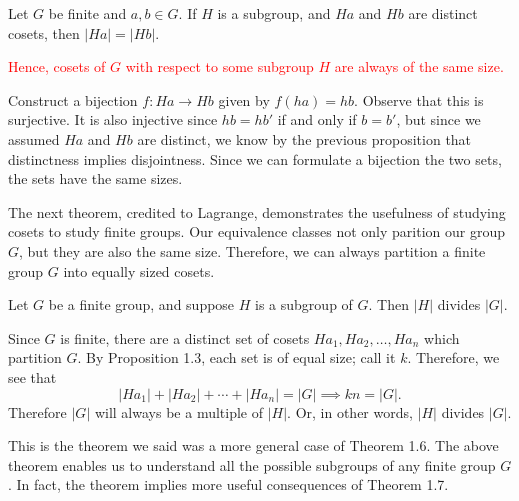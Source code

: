     \begin{proposition}
        Let $G$ be finite and $a, b \in G$. If $H$ is a subgroup, and 
        $Ha$ and $Hb$ are distinct cosets, then $|Ha| = |Hb|$.
    \end{proposition}
        \textcolor{red}{Hence, cosets of $G$ with respect to some
        subgroup $H$ are always of the same size.}
    \begin{prf}
        Construct a bijection $f: Ha \to Hb$ given by $f(ha) = hb$.
        Observe that this is surjective. It is also injective since
        $hb = hb'$ 
        if and only if $b = b'$, but since we assumed $Ha$ and $Hb$
        are distinct, we know by the previous proposition that
        distinctness implies disjointness. Since we can formulate a bijection
        the two sets, the sets have the same sizes.
    \end{prf}

    The next theorem, credited to Lagrange, demonstrates the
    usefulness of studying cosets to study finite groups. Our
    equivalence classes not only parition our group $G$, but they are
    also the same size. Therefore, we can always partition a finite group
    $G$ into equally sized cosets. 

    \begin{thm}
        Let $G$ be a finite group, and suppose $H$ is a subgroup of
        $G$. Then $|H|$ divides $|G|$.
    \end{thm}

    \begin{prf}
        Since $G$ is finite, there are a distinct set of cosets $Ha_1,
        Ha_2, \dots , Ha_n$ which partition $G$. By Proposition 1.3,
        each set is of equal size; call it $k$. Therefore, we see that 
        \[
            |Ha_1| + |Ha_2| + \cdots + |Ha_n| = |G|
            \implies kn = |G|.
        \]
        Therefore $|G|$ will always be a multiple of $|H|$. Or, in
        other words, $|H|$ divides $|G|$.
    \end{prf}
    
    This is the theorem we said was a more general case of Theorem
    1.6. 
    The above theorem enables us to understand all the possible
    subgroups of any finite group $G$. In fact, the theorem implies
    more useful consequences of Theorem 1.7.

